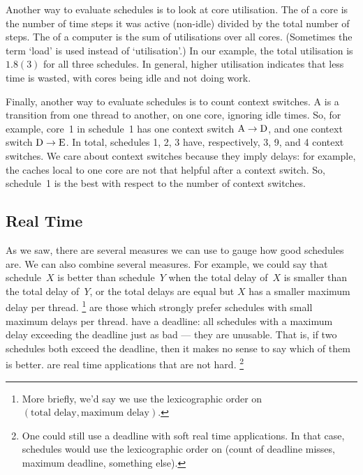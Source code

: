 Another way to evaluate schedules is to look at core utilisation.
The  of a core
  is the number of time steps it was active (non-idle)
  divided by the total number of steps.
The  of a computer is the sum of utilisations over all cores.
(Sometimes the term `load' is used instead of `utilisation'.)
In our example, the total utilisation is $1.8(3)$ for all three schedules.
In general, higher utilisation indicates that less time is wasted,
  with cores being idle and not doing work.

Finally, another way to evaluate schedules is to count context switches.
A  is a transition from one thread to another, on one core,
  ignoring idle times.
So, for example, core~1 in schedule~1 has one context switch ${\rm A}\to{\rm D}$,
  and one context switch ${\rm D}\to{\rm E}$.
In total, schedules 1, 2, 3 have, respectively, 3, 9, and 4 context switches.
We care about context switches because they imply delays:
  for example, the caches local to one core are not that helpful
  after a context switch.
So, schedule~1 is the best with respect to the number of context switches.

\subsection{Real Time}

As we saw, there are several measures we can use to gauge how good schedules are.
We can also combine several measures.
For example,
  we could say that schedule~$X$ is better than schedule~$Y$
  when the total delay of~$X$ is smaller than the total delay of~$Y$,
    or the total delays are equal but $X$ has a smaller maximum delay per thread.%
\footnote{
  More briefly, we'd say we use the lexicographic order on
  $(\text{total delay}, \text{maximum delay})$.
}
 are those which strongly prefer schedules
  with small maximum delays per thread.
 have a deadline:
  all schedules with a maximum delay exceeding the deadline just as bad ---
  they are unusable.
That is, if two schedules both exceed the deadline,
  then it makes no sense to say which of them is better.
 are real time applications that are not hard.%
\footnote{
  One could still use a deadline with soft real time applications.
  In that case, schedules would use the lexicographic order on
    (count of deadline misses, maximum deadline, something else).
}

